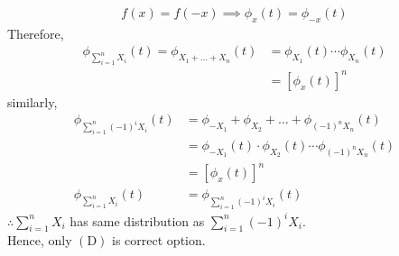\begin{enumerate}[label=\alph*)]
\begin{align}
f(x)=f(-x)\implies \phi_{x}(t)=\phi_{-x}(t)
\end{align}
Therefore,
\begin{align}
\phi_{\sum_{i=1}^{n}X_i}(t) = \phi_{X_{1}+\ldots +X_{n}}(t) &=\phi_{X_{1}}(t)\cdots\phi_{X_{n}}(t)\\
&=\left[\phi_{x}(t)\right]^{n}
\end{align}
similarly,
\begin{align}
\phi_{\sum_{i=1}^{n}(-1)^{i}X_i}(t) &= \phi_{-X_{1}}+\phi_{X_{2}}+\ldots +\phi_{(-1)^{n}X_{n}}(t)\\
&=\phi_{-X_{1}}(t) \cdot \phi_{X_{2}}(t)\cdots\phi_{(-1)^{n}X_{n}}(t)\\
&=\left[\phi_{x}(t)\right]^{n}\\
\phi_{\sum_{i=1}^{n}X_i}(t) &= \phi_{\sum_{i=1}^{n}(-1)^{i}X_i}(t)
\end{align}
$\therefore \sum_{i=1}^{n} X_{i}$ has same distribution as $\sum_{i=1}^{n}(-1)^{i} X_{i}.$\\
Hence, only $(\mathrm{D})$ is correct option.
\end{enumerate}